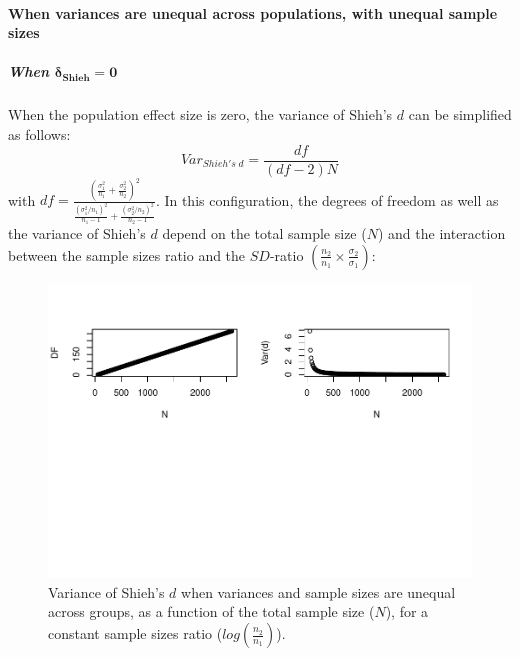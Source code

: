 \documentclass[
  english,
  man,mask]{apa6}
\let\oldparagraph\paragraph
\renewcommand{\paragraph}[1]{\oldparagraph{#1}\mbox{}}
\let\oldsubparagraph\subparagraph
\renewcommand{\subparagraph}[1]{\oldsubparagraph{#1}\mbox{}}
\begin{document}
\hypertarget{when-variances-are-unequal-across-populations-with-unequal-sample-sizes-4}{%
\paragraph{When variances are unequal across populations, with unequal sample sizes}\label{when-variances-are-unequal-across-populations-with-unequal-sample-sizes-4}}

\hypertarget{when-bmdelta_shieh-0-2}{%
\subparagraph{\texorpdfstring{When \(\bm{\delta_{Shieh} = 0}\)}{When \textbackslash bm\{\textbackslash delta\_\{Shieh\} = 0\}}}\label{when-bmdelta_shieh-0-2}}

When the population effect size is zero, the variance of Shieh's \(d\) can be simplified as follows:
\[Var_{Shieh's \; d} = \frac{df}{(df-2)N}\]
with \(df = \frac{\left(\frac{\sigma^2_1}{n_1}+\frac{\sigma^2_2}{n_2} \right)^2}{\frac{(\sigma^2_1/n_1)^2}{n_1-1}+\frac{(\sigma^2_2/n_2)^2}{n_2-1}}\). In this configuration, the degrees of freedom as well as the variance of Shieh's \(d\) depend on the total sample size (\(N\)) and the interaction between the sample sizes ratio and the \(SD\)-ratio \(\left(\frac{n_2}{n_1}\times\frac{\sigma_2}{\sigma_1} \right)\):

\begin{figure}
\centering
\includegraphics{Theoretical-Bias-of-all-estimators-as-a-function-of-population-parameters_files/figure-latex/varshiehhetunbalNsize2-1.pdf}
\caption{\label{fig:varshiehhetunbalNsize2}Variance of Shieh's \(d\) when variances and sample sizes are unequal across groups, as a function of the total sample size (\(N\)), for a constant sample sizes ratio (\(log\left(\frac{n_2}{n_1} \right)\)).}
\end{figure}
\end{document}
